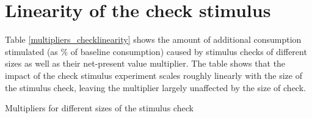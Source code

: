 \documentclass[../HAFiscal]{subfiles}
\begin{document}
\section{Linearity of the check stimulus}
\label{app:CheckMultiplier}

Table \ref{multipliers_checklinearity} shows the amount of additional consumption stimulated (as \% of baseline consumption) caused by stimulus checks of different sizes as well as their net-present value multiplier. The table shows that the impact of the check stimulus experiment scales roughly linearly with the size of the stimulus check, leaving the multiplier largely unaffected by the size of check.

\begin{table}[h] 
	\center
	
	\caption{Multipliers for different sizes of the stimulus check}
	\label{multipliers_checklinearity}
\end{table}
\end{document}
